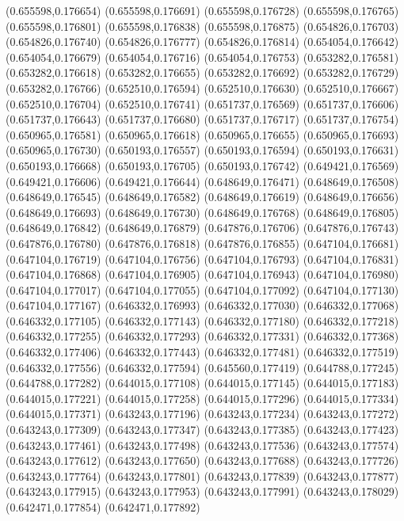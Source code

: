(0.655598,0.176654)
(0.655598,0.176691)
(0.655598,0.176728)
(0.655598,0.176765)
(0.655598,0.176801)
(0.655598,0.176838)
(0.655598,0.176875)
(0.654826,0.176703)
(0.654826,0.176740)
(0.654826,0.176777)
(0.654826,0.176814)
(0.654054,0.176642)
(0.654054,0.176679)
(0.654054,0.176716)
(0.654054,0.176753)
(0.653282,0.176581)
(0.653282,0.176618)
(0.653282,0.176655)
(0.653282,0.176692)
(0.653282,0.176729)
(0.653282,0.176766)
(0.652510,0.176594)
(0.652510,0.176630)
(0.652510,0.176667)
(0.652510,0.176704)
(0.652510,0.176741)
(0.651737,0.176569)
(0.651737,0.176606)
(0.651737,0.176643)
(0.651737,0.176680)
(0.651737,0.176717)
(0.651737,0.176754)
(0.650965,0.176581)
(0.650965,0.176618)
(0.650965,0.176655)
(0.650965,0.176693)
(0.650965,0.176730)
(0.650193,0.176557)
(0.650193,0.176594)
(0.650193,0.176631)
(0.650193,0.176668)
(0.650193,0.176705)
(0.650193,0.176742)
(0.649421,0.176569)
(0.649421,0.176606)
(0.649421,0.176644)
(0.648649,0.176471)
(0.648649,0.176508)
(0.648649,0.176545)
(0.648649,0.176582)
(0.648649,0.176619)
(0.648649,0.176656)
(0.648649,0.176693)
(0.648649,0.176730)
(0.648649,0.176768)
(0.648649,0.176805)
(0.648649,0.176842)
(0.648649,0.176879)
(0.647876,0.176706)
(0.647876,0.176743)
(0.647876,0.176780)
(0.647876,0.176818)
(0.647876,0.176855)
(0.647104,0.176681)
(0.647104,0.176719)
(0.647104,0.176756)
(0.647104,0.176793)
(0.647104,0.176831)
(0.647104,0.176868)
(0.647104,0.176905)
(0.647104,0.176943)
(0.647104,0.176980)
(0.647104,0.177017)
(0.647104,0.177055)
(0.647104,0.177092)
(0.647104,0.177130)
(0.647104,0.177167)
(0.646332,0.176993)
(0.646332,0.177030)
(0.646332,0.177068)
(0.646332,0.177105)
(0.646332,0.177143)
(0.646332,0.177180)
(0.646332,0.177218)
(0.646332,0.177255)
(0.646332,0.177293)
(0.646332,0.177331)
(0.646332,0.177368)
(0.646332,0.177406)
(0.646332,0.177443)
(0.646332,0.177481)
(0.646332,0.177519)
(0.646332,0.177556)
(0.646332,0.177594)
(0.645560,0.177419)
(0.644788,0.177245)
(0.644788,0.177282)
(0.644015,0.177108)
(0.644015,0.177145)
(0.644015,0.177183)
(0.644015,0.177221)
(0.644015,0.177258)
(0.644015,0.177296)
(0.644015,0.177334)
(0.644015,0.177371)
(0.643243,0.177196)
(0.643243,0.177234)
(0.643243,0.177272)
(0.643243,0.177309)
(0.643243,0.177347)
(0.643243,0.177385)
(0.643243,0.177423)
(0.643243,0.177461)
(0.643243,0.177498)
(0.643243,0.177536)
(0.643243,0.177574)
(0.643243,0.177612)
(0.643243,0.177650)
(0.643243,0.177688)
(0.643243,0.177726)
(0.643243,0.177764)
(0.643243,0.177801)
(0.643243,0.177839)
(0.643243,0.177877)
(0.643243,0.177915)
(0.643243,0.177953)
(0.643243,0.177991)
(0.643243,0.178029)
(0.642471,0.177854)
(0.642471,0.177892)
